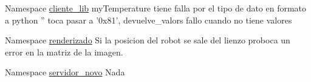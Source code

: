 \label{bug__bug000001}
\hypertarget{bug__bug000001}{}
 
\begin{DoxyDescription}
\item[Namespace \hyperlink{namespacecliente__lib}{cliente\_\-lib} ]myTemperature tiene falla por el tipo de dato en formato a python '' toca pasar a '0x81', devuelve\_\-valors fallo cuando no tiene valores 
\end{DoxyDescription}

\label{bug__bug000002}
\hypertarget{bug__bug000002}{}
 
\begin{DoxyDescription}
\item[Namespace \hyperlink{namespacerenderizado}{renderizado} ]Si la posicion del robot se sale del lienzo proboca un error en la matriz de la imagen. 
\end{DoxyDescription}

\label{bug__bug000003}
\hypertarget{bug__bug000003}{}
 
\begin{DoxyDescription}
\item[Namespace \hyperlink{namespaceservidor__novo}{servidor\_\-novo} ]Nada 
\end{DoxyDescription}